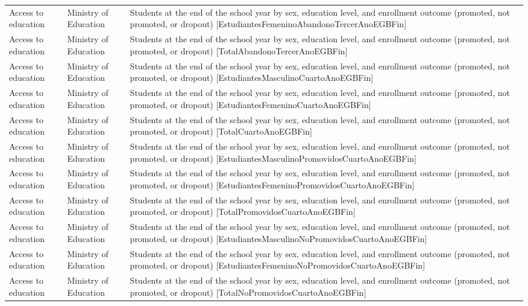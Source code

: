 \documentclass[10pt,a4paper]{article}
\begin{document}
\begin{longtable}{@{}>{\raggedright\arraybackslash}p{3.5cm}>{\raggedright\arraybackslash}p{5.6cm}>{\raggedright\arraybackslash}p{\dimexpr\textwidth-9.1cm-4\tabcolsep\relax}@{}}
Access to education & Ministry of Education & Students at the end of the school year by sex, education level, and enrollment outcome (promoted, not promoted, or dropout) [EstudiantesFemeninoAbandonoTercerAnoEGBFin]\\
Access to education & Ministry of Education & Students at the end of the school year by sex, education level, and enrollment outcome (promoted, not promoted, or dropout) [TotalAbandonoTercerAnoEGBFin]\\
Access to education & Ministry of Education & Students at the end of the school year by sex, education level, and enrollment outcome (promoted, not promoted, or dropout) [EstudiantesMasculinoCuartoAnoEGBFin]\\
Access to education & Ministry of Education & Students at the end of the school year by sex, education level, and enrollment outcome (promoted, not promoted, or dropout) [EstudiantesFemeninoCuartoAnoEGBFin]\\
Access to education & Ministry of Education & Students at the end of the school year by sex, education level, and enrollment outcome (promoted, not promoted, or dropout) [TotalCuartoAnoEGBFin]\\
Access to education & Ministry of Education & Students at the end of the school year by sex, education level, and enrollment outcome (promoted, not promoted, or dropout) [EstudiantesMasculinoPromovidosCuartoAnoEGBFin]\\
Access to education & Ministry of Education & Students at the end of the school year by sex, education level, and enrollment outcome (promoted, not promoted, or dropout) [EstudiantesFemeninoPromovidosCuartoAnoEGBFin]\\
Access to education & Ministry of Education & Students at the end of the school year by sex, education level, and enrollment outcome (promoted, not promoted, or dropout) [TotalPromovidosCuartoAnoEGBFin]\\
Access to education & Ministry of Education & Students at the end of the school year by sex, education level, and enrollment outcome (promoted, not promoted, or dropout) [EstudiantesMasculinoNoPromovidosCuartoAnoEGBFin]\\
Access to education & Ministry of Education & Students at the end of the school year by sex, education level, and enrollment outcome (promoted, not promoted, or dropout) [EstudiantesFemeninoNoPromovidosCuartoAnoEGBFin]\\
Access to education & Ministry of Education & Students at the end of the school year by sex, education level, and enrollment outcome (promoted, not promoted, or dropout) [TotalNoPromovidosCuartoAnoEGBFin]\\

\end{longtable}
\end{document}
